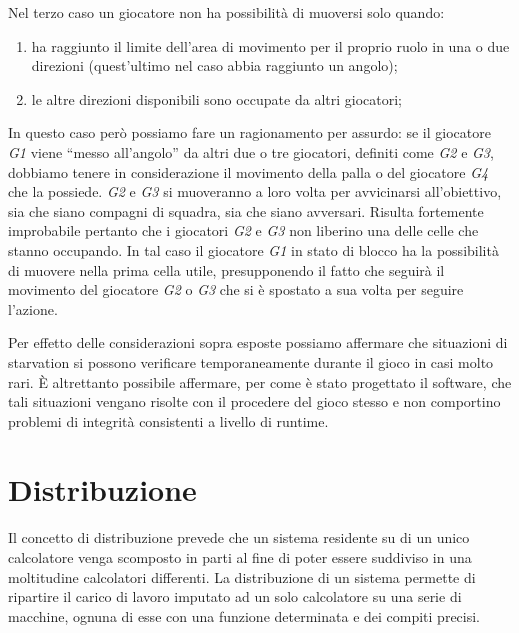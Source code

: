 \documentclass[aps,letterpaper,10pt]{article}
\begin{document}
Nel terzo caso un giocatore non ha possibilit\`a di muoversi solo quando:

\begin{enumerate}
	\item ha raggiunto il limite dell'area di movimento per il proprio ruolo in una o due direzioni (quest'ultimo nel caso abbia raggiunto un angolo);
	\item le altre direzioni disponibili sono occupate da altri giocatori; 
\end{enumerate}

In questo caso per\`o possiamo fare un ragionamento per assurdo: se il giocatore \emph{G1} viene ``messo all'angolo'' da altri due o tre giocatori, definiti come \emph{G2} e \emph{G3}, dobbiamo tenere in considerazione il movimento della palla o del giocatore \emph{G4} che la possiede. \emph{G2} e \emph{G3} si muoveranno a loro volta per avvicinarsi all'obiettivo, sia che siano compagni di squadra, sia che siano avversari. Risulta fortemente improbabile pertanto che i giocatori \emph{G2} e \emph{G3} non liberino una delle celle che stanno occupando. In tal caso il giocatore \emph{G1} in stato di blocco ha la possibilit\`a di muovere nella prima cella utile, presupponendo il fatto che seguir\`a il movimento del giocatore \emph{G2} o \emph{G3} che si \`e spostato a sua volta per seguire l'azione. \vspace{3mm}

Per effetto delle considerazioni sopra esposte possiamo affermare che situazioni di starvation si possono verificare temporaneamente durante il gioco in casi molto rari. \`E altrettanto possibile affermare, per come \`e stato progettato il software, che tali situazioni vengano risolte con il procedere del gioco stesso e non comportino problemi di integrit\`a consistenti a livello di runtime.

\newpage

\section{Distribuzione}

Il concetto di distribuzione prevede che un sistema residente su di un unico calcolatore venga scomposto in parti al fine di poter essere suddiviso in una moltitudine calcolatori differenti. La distribuzione di un sistema permette di ripartire il carico di lavoro imputato ad un solo calcolatore su una serie di macchine, ognuna di esse con una funzione determinata e dei compiti precisi. \vspace{3mm}
\end{document}
